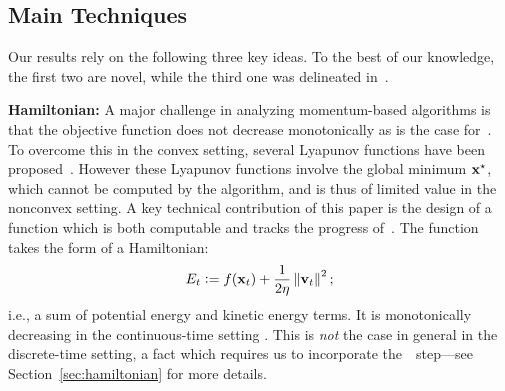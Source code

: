 
\subsection{Main Techniques}\label{sec:tech}
Our results rely on the following three key ideas. To the best of our knowledge, the first two are novel, while the third one was delineated in~\citet{jin2017escape}.

\textbf{Hamiltonian:}
A major challenge in analyzing momentum-based algorithms is that the objective function does not 
decrease monotonically as is the case for~\gd. To overcome this in the convex setting, several Lyapunov functions have been proposed~\citep{wilson2016lyapunov}. However these Lyapunov functions involve the 
global minimum $\mathbf{x}^\star$, which cannot be computed by the algorithm, and is thus of limited value in
the nonconvex setting. A key technical contribution of this paper is the design of a function 
which is both computable and tracks the progress of~\nag. The function takes the form of a
Hamiltonian:
\begin{equation}\label{eqn:hamiltonian}
	E_t \mathrel{\mathop:}= f(\mathbf{x}_t) + \frac{1}{2\eta} \left\|{\mathbf{v}_t}\right\|^2;
\end{equation}
i.e., a sum of potential energy and kinetic energy terms.  It is monotonically decreasing
in the continuous-time setting . This is \emph{not} the case in general in the discrete-time setting,
a fact which requires us to incorporate the~\nce~step---see Section~\ref{sec:hamiltonian} for more details. 





